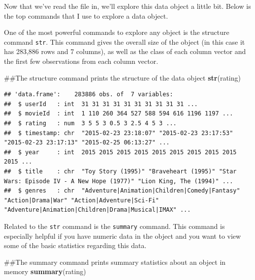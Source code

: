\documentclass[]{book}
\newenvironment{Shaded}{\begin{snugshade}}{\end{snugshade}}
\newcommand{\KeywordTok}[1]{\textcolor[rgb]{0.13,0.29,0.53}{\textbf{{#1}}}}
\newcommand{\NormalTok}[1]{{#1}}
\begin{document}
Now that we've read the file in, we'll explore this data object a little
bit. Below is the top commands that I use to explore a data object.

One of the most powerful commands to explore any object is the structure
command \texttt{str}. This command gives the overall size of the object
(in this case it has 283,886 rows and 7 columns), as well as the class
of each column vector and the first few observations from each column
vector.

\begin{Shaded}
\begin{Highlighting}[]
\NormalTok{##The structure command prints the structure of the data object}
\KeywordTok{str}\NormalTok{(rating)}
\end{Highlighting}
\end{Shaded}

\begin{verbatim}
## 'data.frame':    283886 obs. of  7 variables:
##  $ userId   : int  31 31 31 31 31 31 31 31 31 31 ...
##  $ movieId  : int  1 110 260 364 527 588 594 616 1196 1197 ...
##  $ rating   : num  3 5 5 3 0.5 3 2.5 4 5 3 ...
##  $ timestamp: chr  "2015-02-23 23:18:07" "2015-02-23 23:17:53" "2015-02-23 23:17:13" "2015-02-25 06:13:27" ...
##  $ year     : int  2015 2015 2015 2015 2015 2015 2015 2015 2015 2015 ...
##  $ title    : chr  "Toy Story (1995)" "Braveheart (1995)" "Star Wars: Episode IV - A New Hope (1977)" "Lion King, The (1994)" ...
##  $ genres   : chr  "Adventure|Animation|Children|Comedy|Fantasy" "Action|Drama|War" "Action|Adventure|Sci-Fi" "Adventure|Animation|Children|Drama|Musical|IMAX" ...
\end{verbatim}

Related to the \texttt{str} command is the \texttt{summary} command.
This command is especially helpful if you have numeric data in the
object and you want to view some of the basic statistics regarding this
data.

\begin{Shaded}
\begin{Highlighting}[]
\NormalTok{##The summary command prints summary statistics about an object in memory}
\KeywordTok{summary}\NormalTok{(rating)}
\end{Highlighting}
\end{Shaded}
\end{document}
